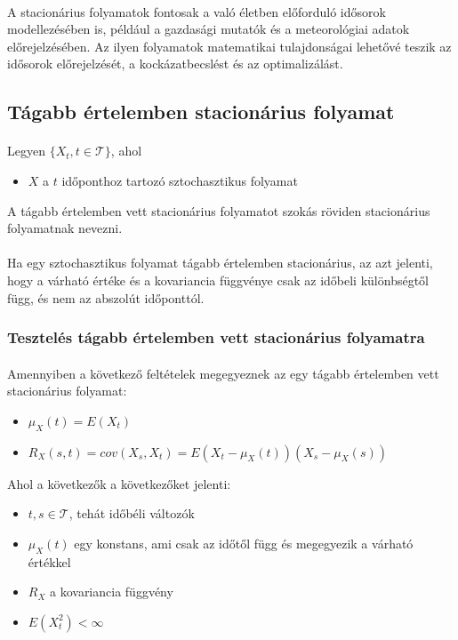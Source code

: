 \documentclass[11pt,a4pape,draftr]{article}
\begin{document}
			\paragraph{}
				A stacionárius folyamatok fontosak a való életben előforduló idősorok modellezésében is, például a gazdasági mutatók és a meteorológiai adatok előrejelzésében. Az ilyen folyamatok matematikai tulajdonságai lehetővé teszik az idősorok előrejelzését, a kockázatbecslést és az optimalizálást. 
			\subsection{Tágabb értelemben stacionárius folyamat}
				\paragraph{}
					Legyen $\{X_t, t \in \mathcal{T}\}$, ahol
					\begin{itemize}
						\item $X$ a $t$ időponthoz tartozó sztochasztikus folyamat
					\end{itemize}
					A tágabb értelemben vett stacionárius folyamatot szokás röviden stacionárius folyamatnak nevezni.
				\paragraph{}
					Ha egy sztochasztikus folyamat tágabb értelemben stacionárius, az azt jelenti, hogy a várható értéke és a kovariancia függvénye csak az időbeli különbségtől függ, és nem az abszolút időponttól.
				\subsubsection{Tesztelés tágabb értelemben vett stacionárius folyamatra}
					\paragraph{}
						Amennyiben a következő feltételek megegyeznek az egy tágabb értelemben vett stacionárius folyamat:
						\begin{itemize}
							\item $\mu_X (t) = E(X_t)$
							\item $R_X(s,t) = cov(X_s, X_t) = E(X_t - \mu_X (t)) (X_s - \mu_X (s))$
						\end{itemize}
						Ahol a következők a következőket jelenti:
						\begin{itemize}
							\item $t, s \in \mathcal{T}$, tehát időbéli változók
							\item $\mu_X (t)$ egy konstans, ami csak az időtől függ és megegyezik a várható értékkel
							\item $R_X$ a kovariancia függvény
							\item $E(X_t^2) < \infty$ 
						\end{itemize}
\end{document}
